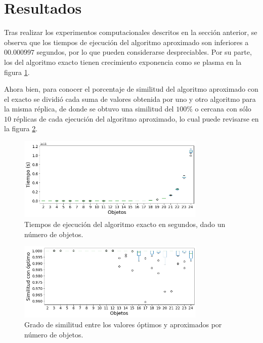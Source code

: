\documentclass[paper=leter, fontsize=11pt]{scrartcl}
\numberwithin{equation}{section}		%
\numberwithin{figure}{section}			%
\numberwithin{table}{section}				%
\begin{document}
\section{Resultados}

Tras realizar los experimentos computacionales descritos en la sección anterior, se observa que los tiempos de ejecución del algoritmo aproximado son inferiores a $00.000997$ segundos, por lo que pueden considerarse despreciables. Por su parte, los del algoritmo exacto tienen crecimiento exponencia como se plasma en la figura \ref{tiempo_mejores}.

Ahora bien, para conocer el porcentaje de similitud del algoritmo aproximado con el exacto se dividió cada suma de valores obtenida por uno y otro algoritmo para la misma réplica, de donde se obtuvo una similitud del $100 \%$ o cercana con sólo $10$ réplicas de cada ejecución del algoritmo aproximado, lo cual puede revisarse en la figura \ref{porcentaje}.

\begin{figure}
    \centering
    \includegraphics[width=0.8\textwidth]{tiempo_mejores.png}
    \caption{Tiempos de ejecución del algoritmo exacto en segundos, dado un número de objetos.}
    \label{tiempo_mejores}
\end{figure}

\begin{figure}
    \centering
    \includegraphics[width=0.8\textwidth]{porcentaje.png}
    \caption{Grado de similitud entre los valores óptimos y aproximados por número de objetos.}
    \label{porcentaje}
\end{figure}
\end{document}
